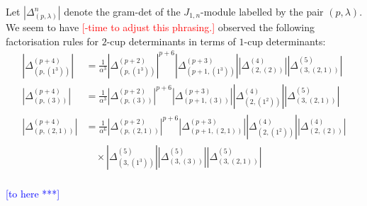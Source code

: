 \documentclass{article}
\newcommand{\ppm}[1]{\textcolor{red}{#1}}
\newcommand{\bajm}[1]{\textcolor{blue}{#1}}
\theoremstyle{definition}
\newcommand{\Deltaa}{\Delta}   %
\newcommand{\Deltaaa}[2]{\Deltaa^{#1}_{#2}}
\def\a{\alpha}
\def\l{\lambda}
\numberwithin{equation}{subsection}
\begin{document}
{Let $\left|\Deltaaa{n}{(p,\l)}\right|$ denote the gram-det of the $J_{1,n}$-module labelled by the pair $(p,\l)$. We seem to have \ppm{[-time to adjust this phrasing.]} observed the following factorisation rules for $2$-cup determinants in terms of $1$-cup determinants:
\begin{align*}
 \left|\Delta_{(p,(1^3))}^{(p+4)}\right|&=\frac{1}{\a^3}
    \left|\Delta_{(p,(1^3))}^{(p+2)}\right|^{p+6}
    \left|\Delta_{(p+1,(1^3))}^{(p+3)}\right|
    \left|\Delta_{(2,(2))}^{(4)}\right|
    \left|\Delta_{(3,(2,1))}^{(5)}\right|\\
 \left|\Delta_{(p,(3))}^{(p+4)}\right|&=\frac{1}{\a^3}
    \left|\Delta_{(p,(3))}^{(p+2)}\right|^{p+6}
    \left|\Delta_{(p+1,(3))}^{(p+3)}\right|
    \left|\Delta_{(2,(1^2))}^{(4)}\right|
    \left|\Delta_{(3,(2,1))}^{(5)}\right|\\
 \left|\Delta_{(p,(2,1))}^{(p+4)}\right|&=\frac{1}{\a^6}
    \left|\Delta_{(p,(2,1))}^{(p+2)}\right|^{p+6}
    \left|\Delta_{(p+1,(2,1))}^{(p+3)}\right|
    \left|\Delta_{(2,(1^2))}^{(4)}\right|\left|\Delta_{(2,(2))}^{(4)}\right|\\
    &\quad \times\left|\Delta_{(3,(1^3))}^{(5)}\right|\left|\Delta_{(3,(3))}^{(5)}\right|   
    \left|\Delta_{(3,(2,1))}^{(5)}\right|\\
\end{align*}

\bajm{[to here ***]}}
\end{document}
